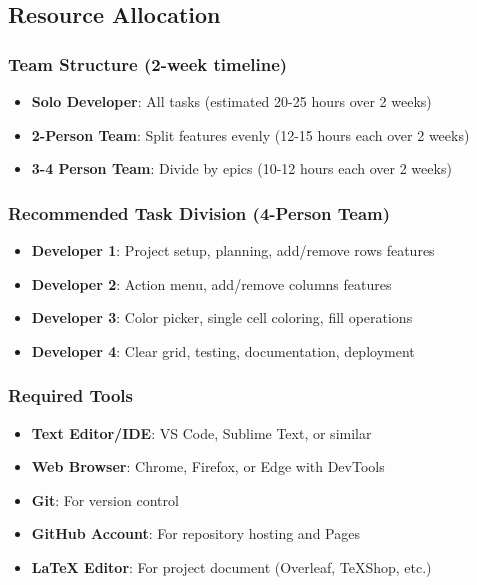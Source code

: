 \documentclass[11pt,a4paper]{article}
\begin{document}
\subsection{Resource Allocation}

\subsubsection{Team Structure (2-week timeline)}
\begin{itemize}[leftmargin=*]
    \item \textbf{Solo Developer}: All tasks (estimated 20-25 hours over 2 weeks)
    \item \textbf{2-Person Team}: Split features evenly (12-15 hours each over 2 weeks)
    \item \textbf{3-4 Person Team}: Divide by epics (10-12 hours each over 2 weeks)
\end{itemize}

\subsubsection{Recommended Task Division (4-Person Team)}
\begin{itemize}[leftmargin=*]
    \item \textbf{Developer 1}: Project setup, planning, add/remove rows features
    \item \textbf{Developer 2}: Action menu, add/remove columns features
    \item \textbf{Developer 3}: Color picker, single cell coloring, fill operations
    \item \textbf{Developer 4}: Clear grid, testing, documentation, deployment
\end{itemize}

\subsubsection{Required Tools}
\begin{itemize}[leftmargin=*]
    \item \textbf{Text Editor/IDE}: VS Code, Sublime Text, or similar
    \item \textbf{Web Browser}: Chrome, Firefox, or Edge with DevTools
    \item \textbf{Git}: For version control
    \item \textbf{GitHub Account}: For repository hosting and Pages
    \item \textbf{LaTeX Editor}: For project document (Overleaf, TeXShop, etc.)
\end{itemize}
\end{document}
